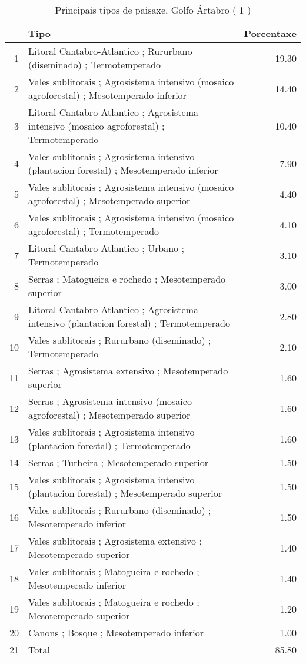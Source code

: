 \begin{table}[p]
\centering
\caption{Principais tipos de paisaxe,  Golfo Ártabro ( 1 )} 
\label{Tipos 1}
\begin{tabular}{rlr}
  \hline
 & Tipo & Porcentaxe \\ 
  \hline
1 & Litoral Cantabro-Atlantico ; Rururbano (diseminado) ; Termotemperado & 19.30 \\ 
  2 & Vales sublitorais ; Agrosistema intensivo (mosaico agroforestal) ; Mesotemperado inferior & 14.40 \\ 
  3 & Litoral Cantabro-Atlantico ; Agrosistema intensivo (mosaico agroforestal) ; Termotemperado & 10.40 \\ 
  4 & Vales sublitorais ; Agrosistema intensivo (plantacion forestal) ; Mesotemperado inferior & 7.90 \\ 
  5 & Vales sublitorais ; Agrosistema intensivo (mosaico agroforestal) ; Mesotemperado superior & 4.40 \\ 
  6 & Vales sublitorais ; Agrosistema intensivo (mosaico agroforestal) ; Termotemperado & 4.10 \\ 
  7 & Litoral Cantabro-Atlantico ; Urbano ; Termotemperado & 3.10 \\ 
  8 & Serras ; Matogueira e rochedo ; Mesotemperado superior & 3.00 \\ 
  9 & Litoral Cantabro-Atlantico ; Agrosistema intensivo (plantacion forestal) ; Termotemperado & 2.80 \\ 
  10 & Vales sublitorais ; Rururbano (diseminado) ; Termotemperado & 2.10 \\ 
  11 & Serras ; Agrosistema extensivo ; Mesotemperado superior & 1.60 \\ 
  12 & Serras ; Agrosistema intensivo (mosaico agroforestal) ; Mesotemperado superior & 1.60 \\ 
  13 & Vales sublitorais ; Agrosistema intensivo (plantacion forestal) ; Termotemperado & 1.60 \\ 
  14 & Serras ; Turbeira ; Mesotemperado superior & 1.50 \\ 
  15 & Vales sublitorais ; Agrosistema intensivo (plantacion forestal) ; Mesotemperado superior & 1.50 \\ 
  16 & Vales sublitorais ; Rururbano (diseminado) ; Mesotemperado inferior & 1.50 \\ 
  17 & Vales sublitorais ; Agrosistema extensivo ; Mesotemperado superior & 1.40 \\ 
  18 & Vales sublitorais ; Matogueira e rochedo ; Mesotemperado inferior & 1.40 \\ 
  19 & Vales sublitorais ; Matogueira e rochedo ; Mesotemperado superior & 1.20 \\ 
  20 & Canons ; Bosque ; Mesotemperado inferior & 1.00 \\ 
  21 & Total & 85.80 \\ 
   \hline
\end{tabular}
\end{table}
